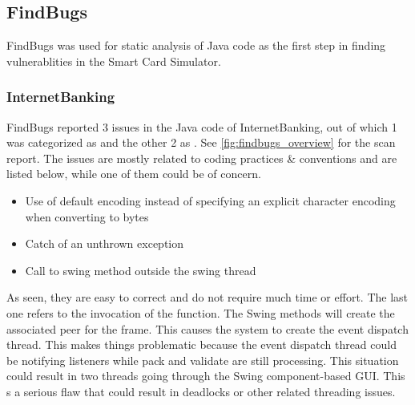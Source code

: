 \subsection{FindBugs}
FindBugs was used for static analysis of Java code as the first step in finding vulnerablities in the Smart Card Simulator.

\subsubsection{InternetBanking}
FindBugs reported 3 issues in the Java code of InternetBanking, out of which 1 was categorized as  and the other 2 as . See \ref{fig:findbugs_overview} for the scan report.
The issues are mostly related to coding practices \& conventions and are listed below, while one of them could be of concern.
\begin{itemize}
	\item Use of default encoding instead of specifying an explicit character encoding when converting to bytes
	\item Catch of an unthrown exception
	\item Call to swing method outside the swing thread
\end{itemize}
As seen, they are easy to correct and do not require much time or effort. The last one refers to the invocation of the  function. The Swing methods  will create the associated peer for the frame. This causes the system to create the event dispatch thread. This makes things problematic because the event dispatch thread could be notifying listeners while pack and validate are still processing. This situation could result in two threads going through the Swing component-based GUI. This s a serious flaw that could result in deadlocks or other related threading issues.

